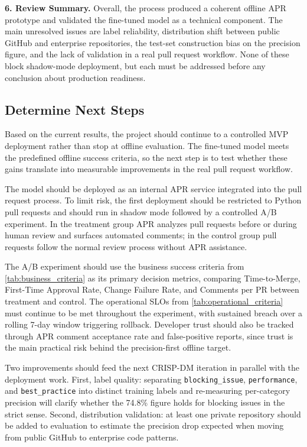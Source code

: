 \documentclass[11pt]{article}
\begin{document}
\textbf{6. Review Summary.}
Overall, the process produced a coherent offline APR prototype and validated the fine-tuned model as a technical component. The main unresolved issues are label reliability, distribution shift between public GitHub and enterprise repositories, the test-set construction bias on the precision figure, and the lack of validation in a real pull request workflow. None of these block shadow-mode deployment, but each must be addressed before any conclusion about production readiness.

\subsection*{Determine Next Steps}

Based on the current results, the project should continue to a controlled MVP deployment rather than stop at offline evaluation. The fine-tuned model meets the predefined offline success criteria, so the next step is to test whether these gains translate into measurable improvements in the real pull request workflow.

The model should be deployed as an internal APR service integrated into the pull request process. To limit risk, the first deployment should be restricted to Python pull requests and should run in shadow mode followed by a controlled A/B experiment. In the treatment group APR analyzes pull requests before or during human review and surfaces automated comments; in the control group pull requests follow the normal review process without APR assistance.

The A/B experiment should use the business success criteria from \cref{tab:business_criteria} as its primary decision metrics, comparing Time-to-Merge, First-Time Approval Rate, Change Failure Rate, and Comments per PR between treatment and control. The operational SLOs from \cref{tab:operational_criteria} must continue to be met throughout the experiment, with sustained breach over a rolling 7-day window triggering rollback. Developer trust should also be tracked through APR comment acceptance rate and false-positive reports, since trust is the main practical risk behind the precision-first offline target.

Two improvements should feed the next CRISP-DM iteration in parallel with the deployment work. First, label quality: separating \texttt{blocking\_issue}, \texttt{performance}, and \texttt{best\_practice} into distinct training labels and re-measuring per-category precision will clarify whether the 74.8\% figure holds for blocking issues in the strict sense. Second, distribution validation: at least one private repository should be added to evaluation to estimate the precision drop expected when moving from public GitHub to enterprise code patterns.
\end{document}

